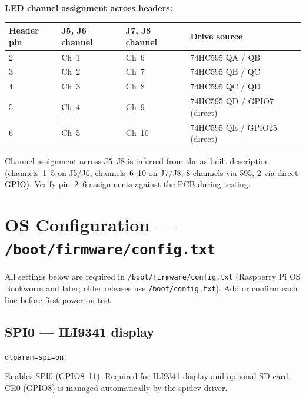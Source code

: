 \documentclass[11pt,a4paper]{article}
\begin{document}
\vspace{6pt}
\textbf{LED channel assignment across headers:}

\begin{tabular}{C{1.4cm} C{2.2cm} C{2.8cm} L{5cm}}
  \toprule
  \color{white}\textbf{Header pin} &
  \color{white}\textbf{J5, J6 channel} &
  \color{white}\textbf{J7, J8 channel} &
  \color{white}\textbf{Drive source} \\
  \midrule
  2 & Ch~1  & Ch~6  & 74HC595 QA / QB \\
  3 & Ch~2  & Ch~7  & 74HC595 QB / QC \\
  4 & Ch~3  & Ch~8  & 74HC595 QC / QD \\
  5 & Ch~4  & Ch~9  & 74HC595 QD / GPIO7 (direct) \\
  6 & Ch~5  & Ch~10 & 74HC595 QE / GPIO25 (direct) \\
  \bottomrule
\end{tabular}

\begin{notebox}
Channel assignment across J5--J8 is inferred from the as-built description
(channels~1--5 on J5/J6, channels~6--10 on J7/J8, 8 channels via 595, 2 via direct GPIO).
Verify pin~2--6 assignments against the PCB during testing.
\end{notebox}

\section{OS Configuration --- \texttt{/boot/firmware/config.txt}}
\label{sec:osconfig}

All settings below are required in \texttt{/boot/firmware/config.txt}
(Raspberry Pi OS Bookworm and later; older releases use \texttt{/boot/config.txt}).
Add or confirm each line before first power-on test.

\subsection{SPI0 --- ILI9341 display}

\begin{alltt}\small
dtparam=spi=on
\end{alltt}

Enables SPI0 (GPIO8--11). Required for ILI9341 display and optional SD card.
CE0 (GPIO8) is managed automatically by the spidev driver.
\end{document}
